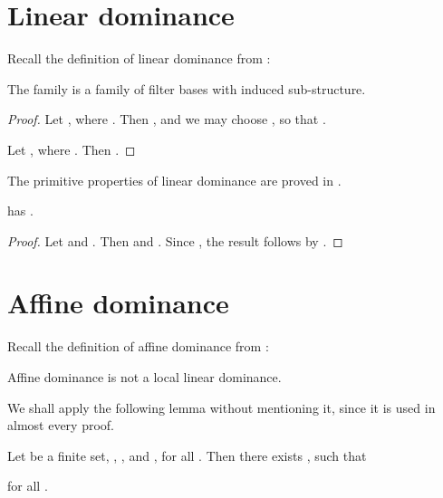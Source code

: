\documentclass[b5paper, english, oneside]{memoir}
\begin{document}
\section{Linear dominance}
\label{LinearDominance}

Recall the definition of linear dominance from :

\begin{theorem}
\label{LinearDominanceIsLocalLinearDominance}
The family  is a family of filter bases with induced sub-structure.
\end{theorem}

\begin{proof}
Let , where . Then , and we may choose , so that . 

Let , where . Then .
\end{proof}

\begin{note}[]
The primitive properties of linear dominance are proved in .
\end{note}

\begin{theorem}
\label{LinearExtensibility}
 has .
\end{theorem}

\begin{proof}
Let  and . Then  and . Since , the result follows by . 
\end{proof}

\section{Affine dominance}
\label{AffineDominance}

Recall the definition of affine dominance from :

\begin{note}[]
Affine dominance is not a local linear dominance. 
\end{note}

We shall apply the following lemma without mentioning it, since it is used in almost every proof.

\begin{theorem}
\label{AffineSingleConstant}
Let  be a finite set, , , and , for all . Then there exists , such that

for all .
\end{theorem}
\end{document}
